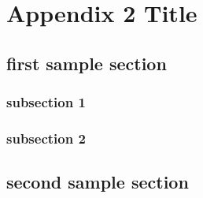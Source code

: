 \chapter{Appendix 2 Title}

\blindtext

\section{first sample section}

\subsection{subsection 1}

\blindtext

\subsection{subsection 2}

\blindtext

\section{second sample section}

\blindtext
